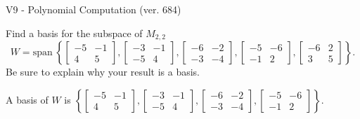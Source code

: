 \begin{exercise}
  \begin{exerciseTitle}V9 - Polynomial Computation (ver. 684)\end{exerciseTitle}
  \begin{exerciseStatement}
    Find a basis for the subspace of \(M_{2,2}\) 
\[W=\mathrm{span}\ \left\{\left[\begin{array}{cc}
-5 & -1 \\
4 & 5
\end{array}\right] , \left[\begin{array}{cc}
-3 & -1 \\
-5 & 4
\end{array}\right] , \left[\begin{array}{cc}
-6 & -2 \\
-3 & -4
\end{array}\right] , \left[\begin{array}{cc}
-5 & -6 \\
-1 & 2
\end{array}\right] , \left[\begin{array}{cc}
-6 & 2 \\
3 & 5
\end{array}\right]\right\}.\]
 Be sure to explain why your result is a basis.


  \end{exerciseStatement}
  \begin{exerciseAnswer}
   A basis of \(W\) is  \(\left\{\left[\begin{array}{cc}
-5 & -1 \\
4 & 5
\end{array}\right] , \left[\begin{array}{cc}
-3 & -1 \\
-5 & 4
\end{array}\right] , \left[\begin{array}{cc}
-6 & -2 \\
-3 & -4
\end{array}\right] , \left[\begin{array}{cc}
-5 & -6 \\
-1 & 2
\end{array}\right]\right\}\).
  


  \end{exerciseAnswer}
\end{exercise}